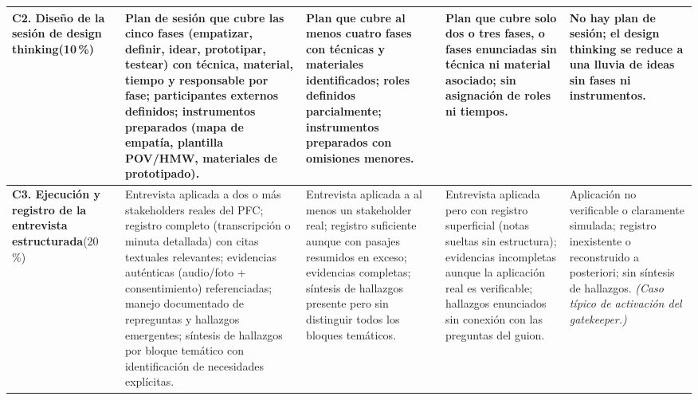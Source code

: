 \documentclass[10pt,a4paper]{article}
\begin{document}
\begin{landscape}
\begin{longtable}{|L{2.9cm}|L{5.0cm}|L{5.0cm}|L{5.0cm}|L{5.0cm}|}
\textbf{C2. Diseño de la sesión de design thinking}\newline(10\,\%) &
Plan de sesión que cubre las cinco fases (empatizar, definir, idear, prototipar, testear) con técnica, material, tiempo y responsable por fase; participantes externos definidos; instrumentos preparados (mapa de empatía, plantilla POV/HMW, materiales de prototipado). &
Plan que cubre al menos cuatro fases con técnicas y materiales identificados; roles definidos parcialmente; instrumentos preparados con omisiones menores. &
Plan que cubre solo dos o tres fases, o fases enunciadas sin técnica ni material asociado; sin asignación de roles ni tiempos. &
No hay plan de sesión; el design thinking se reduce a una lluvia de ideas sin fases ni instrumentos.\\
\hline

\textbf{C3. Ejecución y registro de la entrevista estructurada}\newline{}(20\,\%) &
Entrevista aplicada a dos o más stakeholders reales del PFC; registro completo (transcripción o minuta detallada) con citas textuales relevantes; evidencias auténticas (audio/foto + consentimiento) referenciadas; manejo documentado de repreguntas y hallazgos emergentes; síntesis de hallazgos por bloque temático con identificación de necesidades explícitas. &
Entrevista aplicada a al menos un stakeholder real; registro suficiente aunque con pasajes resumidos en exceso; evidencias completas; síntesis de hallazgos presente pero sin distinguir todos los bloques temáticos. &
Entrevista aplicada pero con registro superficial (notas sueltas sin estructura); evidencias incompletas aunque la aplicación real es verificable; hallazgos enunciados sin conexión con las preguntas del guion. &
Aplicación no verificable o claramente simulada; registro inexistente o reconstruido a posteriori; sin síntesis de hallazgos. \textit{(Caso típico de activación del gatekeeper.)}\\
\hline


\end{longtable}
\end{landscape}
\end{document}
